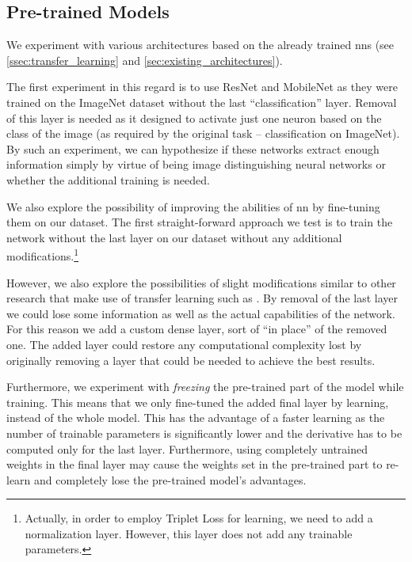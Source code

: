 \subsection{Pre-trained Models}

\label{ssec:pretrained_models}

We experiment with various architectures based on the already trained \glspl{nn} (see \autoref{ssec:transfer_learning} and \autoref{sec:existing_architectures}).

The first experiment in this regard is to use ResNet and MobileNet as they were trained on the ImageNet dataset without the last ``classification'' layer. Removal of this layer is needed as it designed to activate just one neuron based on the class of the image (as required by the original task -- classification on ImageNet). By such an experiment, we can hypothesize if these networks extract enough information simply by virtue of being image distinguishing neural networks or whether the additional training is needed.

We also explore the possibility of improving the abilities of \gls{nn} by fine-tuning them on our dataset. The first straight-forward approach we test is to train the network without the last layer on our dataset without any additional modifications.\footnote{Actually, in order to employ Triplet Loss for learning, we need to add a normalization layer. However, this layer does not add any trainable parameters.}

However, we also explore the possibilities of slight modifications similar to other research that make use of transfer learning such as \cite{tajbakhsh2016convolutional}. By removal of the last layer we could lose some information as well as the actual capabilities of the network. For this reason we add a custom dense layer, sort of ``in place'' of the removed one. The added layer could restore any computational complexity lost by originally removing a layer that could be needed to achieve the best results.

Furthermore, we experiment with \emph{freezing} the pre-trained part of the model while training. This means that we only fine-tuned the added final layer by learning, instead of the whole model. This has the advantage of a faster learning as the number of trainable parameters is significantly lower and the derivative has to be computed only for the last layer. Furthermore, using completely untrained weights in the final layer may cause the weights set in the pre-trained part to re-learn and completely lose the pre-trained model's advantages.

